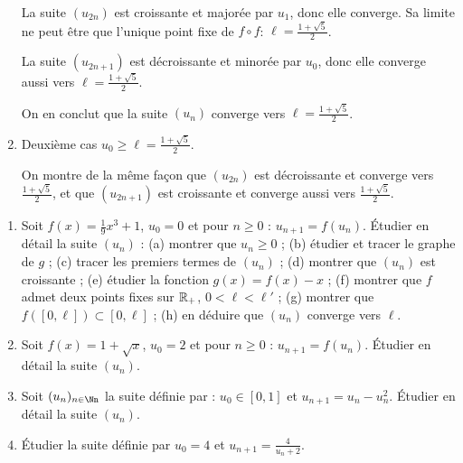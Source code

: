 \documentclass[class=report,crop=false]{standalone}
\begin{document}
\begin{exemple}
\begin{enumerate}
  La suite $(u_{2n})$ est croissante et majorée par $u_1$, donc elle converge. Sa limite ne peut
  être que l'unique point fixe de $f\circ f$: $\ell = \frac{1+\sqrt{5}}{2}$.

   La suite $(u_{2n+1})$ est décroissante et minorée par $u_0$, donc elle converge aussi vers
   $\ell = \frac{1+\sqrt{5}}{2}$.

   On en conclut que la suite $(u_{n})$ converge vers $\ell = \frac{1+\sqrt{5}}{2}$.

  \item Deuxième cas $u_0 \ge \ell = \frac{1+\sqrt{5}}{2}$.

  On montre de la même façon que $(u_{2n})$ est décroissante et converge vers $\frac{1+\sqrt{5}}{2}$,
  et que $(u_{2n+1})$ est croissante et converge aussi vers $\frac{1+\sqrt{5}}{2}$.


\end{enumerate}

\end{exemple}




\begin{miniexercices}
\sauteligne
\begin{enumerate}

  \item Soit $f(x)=\frac19x^3+1$, $u_0=0$ et pour $n\ge0$ :
  $u_{n+1}=f(u_n)$. \'Etudier en détail la suite $(u_n)$ :
(a) montrer que $u_n\ge0$ ;
(b) étudier et tracer le graphe de $g$ ;
(c) tracer les premiers termes de $(u_n)$ ;
(d) montrer que $(u_n)$ est croissante ;
(e) étudier la fonction $g(x)=f(x)-x$ ;
(f) montrer que $f$ admet deux points fixes sur $\mathbb{R}_+$, $0 < \ell < \ell'$ ;
(g) montrer que $f([0,\ell]) \subset [0,\ell]$ ;
(h) en déduire que $(u_n)$ converge vers $\ell$.


  \item Soit $f(x)=1+\sqrt{x}$, $u_0= 2$ et pour $n\ge0$ :
  $u_{n+1}=f(u_n)$. \'Etudier en détail la suite $(u_n)$.


  \item Soit $(u_n)_{n\in\Nn}$ la suite définie par :
$u_0 \in[0,1]$ et $u_{n+1} = u_n - u_n^2$. \'Etudier en détail la suite $(u_n)$.

  \item \'Etudier la suite définie par $u_0=4$ et $u_{n+1}=\frac{4}{u_n+2}$.

\end{enumerate}
\end{miniexercices}



\finchapitre
\end{document}
